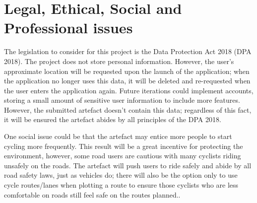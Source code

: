 \clearpage
\section{Legal, Ethical, Social and Professional issues}
\label{intro:legal...issues}

The legislation to consider for this project is the Data Protection Act 2018 (DPA 2018). The project does not store personal information. However, the user’s approximate location will be requested upon the launch of the application; when the application no longer uses this data, it will be deleted and re-requested when the user enters the application again. Future iterations could implement accounts, storing a small amount of sensitive user information to include more features. However, the submitted artefact doesn't contain this data; regardless of this fact, it will be ensured the artefact abides by all principles of the DPA 2018.

One social issue could be that the artefact may entice more people to start cycling more frequently. This result will be a great incentive for protecting the environment, however, some road users are cautious with many cyclists riding unsafely on the roads. The artefact will push users to ride safely and abide by all road safety laws, just as vehicles do; there will also be the option only to use cycle routes/lanes when plotting a route to ensure those cyclists who are less comfortable on roads still feel safe on the routes planned..